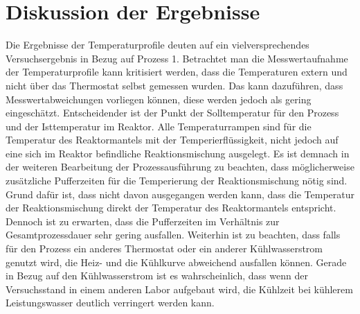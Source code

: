 \section{Diskussion der Ergebnisse}
\label{sec:diskussion}

Die Ergebnisse der Temperaturprofile deuten auf ein vielversprechendes Versuchsergebnis in Bezug auf Prozess 1. Betrachtet man die Messwertaufnahme der Temperaturprofile kann kritisiert werden, dass die Temperaturen extern und nicht über das Thermostat selbst gemessen wurden. Das kann dazuführen, dass Messwertabweichungen vorliegen können, diese werden jedoch als gering eingeschätzt. Entscheidender ist der Punkt der Solltemperatur für den Prozess und der Isttemperatur im Reaktor. Alle Temperaturrampen sind für die Temperatur des Reaktormantels mit der Temperierflüssigkeit, nicht jedoch auf eine sich im Reaktor befindliche Reaktionsmischung ausgelegt. Es ist demnach in der weiteren Bearbeitung der Prozessausführung zu beachten, dass möglicherweise zusätzliche Pufferzeiten für die Temperierung der Reaktionsmischung nötig sind. Grund dafür ist, dass nicht davon ausgegangen werden kann, dass die Temperatur der Reaktionsmischung direkt der Temperatur des Reaktormantels entspricht. Dennoch ist zu erwarten, dass die Pufferzeiten im Verhältnis zur Gesamtprozessdauer sehr gering ausfallen. Weiterhin ist zu beachten, dass falls für den Prozess ein anderes Thermostat oder ein anderer Kühlwasserstrom genutzt wird, die Heiz- und die Kühlkurve abweichend ausfallen können. Gerade in Bezug auf den Kühlwasserstrom ist es wahrscheinlich, dass wenn der Versuchsstand in einem anderen Labor aufgebaut wird, die Kühlzeit bei kühlerem Leistungswasser deutlich verringert werden kann.\\

